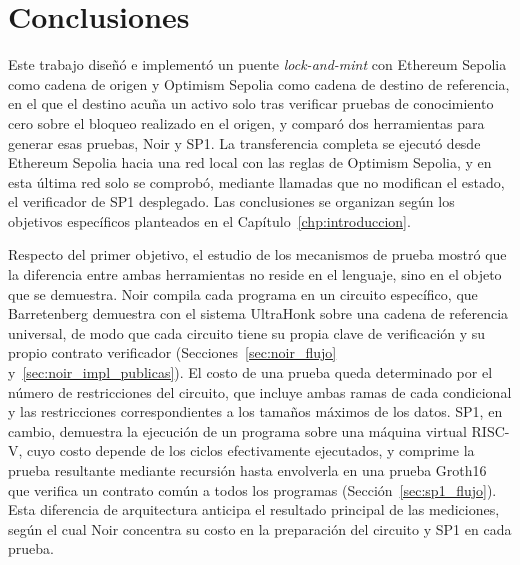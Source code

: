 \section{Conclusiones}
\label{sec:conclusiones}

Este trabajo diseñó e implementó un puente \textit{lock-and-mint} con Ethereum Sepolia como
cadena de origen y Optimism Sepolia como cadena de destino de referencia, en el que el destino
acuña un activo solo tras verificar pruebas de conocimiento cero sobre el bloqueo realizado en el
origen, y comparó dos herramientas para generar esas pruebas, Noir y SP1. La transferencia
completa se ejecutó desde Ethereum Sepolia hacia una red local con las reglas de Optimism
Sepolia, y en esta última red solo se comprobó, mediante llamadas que no modifican el estado, el
verificador de SP1 desplegado. Las conclusiones se organizan según los objetivos específicos
planteados en el Capítulo~\ref{chp:introduccion}.

Respecto del primer objetivo, el estudio de los mecanismos de prueba mostró que la
diferencia entre ambas herramientas no reside en el lenguaje, sino en el objeto que se demuestra.
Noir compila cada programa en un circuito específico, que Barretenberg demuestra con el sistema
UltraHonk sobre una cadena de referencia universal, de modo que cada circuito tiene su propia clave
de verificación y su propio contrato verificador
(Secciones~\ref{sec:noir_flujo} y~\ref{sec:noir_impl_publicas}). El costo de una prueba queda
determinado por el número de restricciones del circuito, que incluye ambas ramas de cada
condicional y las restricciones correspondientes a los tamaños máximos de los datos. SP1, en
cambio, demuestra la ejecución de un programa sobre una máquina virtual RISC-V, cuyo costo depende
de los ciclos efectivamente ejecutados, y comprime la prueba resultante mediante recursión hasta
envolverla en una prueba Groth16 que verifica un contrato común a todos los programas
(Sección~\ref{sec:sp1_flujo}). Esta diferencia de arquitectura anticipa el resultado principal de
las mediciones, según el cual Noir concentra su costo en la preparación del circuito y SP1 en cada
prueba.

